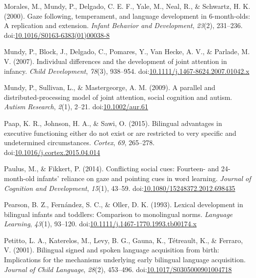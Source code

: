\documentclass[,man,floatsintext]{apa6}
\begin{document}
\leavevmode\hypertarget{ref-Morales_etal_2000}{}%
Morales, M., Mundy, P., Delgado, C. E. F., Yale, M., Neal, R., \& Schwartz, H. K. (2000). Gaze following, temperament, and language development in 6-month-olds: A replication and extension. \emph{Infant Behavior and Development}, \emph{23}(2), 231--236. doi:\href{https://doi.org/10.1016/S0163-6383(01)00038-8}{10.1016/S0163-6383(01)00038-8}

\leavevmode\hypertarget{ref-Mundy_etal_2007}{}%
Mundy, P., Block, J., Delgado, C., Pomares, Y., Van Hecke, A. V., \& Parlade, M. V. (2007). Individual differences and the development of joint attention in infancy. \emph{Child Development}, \emph{78}(3), 938--954. doi:\href{https://doi.org/10.1111/j.1467-8624.2007.01042.x}{10.1111/j.1467-8624.2007.01042.x}

\leavevmode\hypertarget{ref-Mundy_etal_2009}{}%
Mundy, P., Sullivan, L., \& Mastergeorge, A. M. (2009). A parallel and distributed-processing model of joint attention, social cognition and autism. \emph{Autism Research}, \emph{2}(1), 2--21. doi:\href{https://doi.org/10.1002/aur.61}{10.1002/aur.61}

\leavevmode\hypertarget{ref-Paap_etal_2015}{}%
Paap, K. R., Johnson, H. A., \& Sawi, O. (2015). Bilingual advantages in executive functioning either do not exist or are restricted to very specific and undetermined circumstances. \emph{Cortex}, \emph{69}, 265--278. doi:\href{https://doi.org/10.1016/j.cortex.2015.04.014}{10.1016/j.cortex.2015.04.014}

\leavevmode\hypertarget{ref-Paulus_Fikkert_2014}{}%
Paulus, M., \& Fikkert, P. (2014). Conflicting social cues: Fourteen- and 24-month-old infants' reliance on gaze and pointing cues in word learning. \emph{Journal of Cognition and Development}, \emph{15}(1), 43--59. doi:\href{https://doi.org/10.1080/15248372.2012.698435}{10.1080/15248372.2012.698435}

\leavevmode\hypertarget{ref-Pearson_etal_1993}{}%
Pearson, B. Z., Fernández, S. C., \& Oller, D. K. (1993). Lexical development in bilingual infants and toddlers: Comparison to monolingual norms. \emph{Language Learning}, \emph{43}(1), 93--120. doi:\href{https://doi.org/10.1111/j.1467-1770.1993.tb00174.x}{10.1111/j.1467-1770.1993.tb00174.x}

\leavevmode\hypertarget{ref-Petitto_etal_2001}{}%
Petitto, L. A., Katerelos, M., Levy, B. G., Gauna, K., Tétreault, K., \& Ferraro, V. (2001). Bilingual signed and spoken language acquisition from birth: Implications for the mechanisms underlying early bilingual language acquisition. \emph{Journal of Child Language}, \emph{28}(2), 453--496. doi:\href{https://doi.org/10.1017/S0305000901004718}{10.1017/S0305000901004718}
\end{document}
